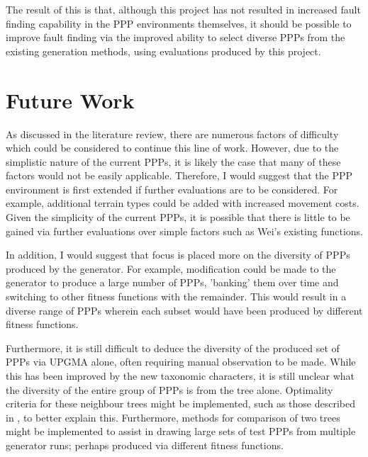 \documentclass[authoryearcitations]{UoYCSproject}
\begin{document}
The result of this is that, although this project has not resulted in increased fault finding capability in the PPP environments themselves, it should be possible to improve fault finding via the improved ability to select diverse PPPs from the existing generation methods, using evaluations produced by this project.

\chapter{Future Work}
\label{cha:futWork}
As discussed in the literature review, there are numerous factors of difficulty which could be considered to continue this line of work. However, due to the simplistic nature of the current PPPs, it is likely the case that many of these factors would not be easily applicable. Therefore, I would suggest that the PPP environment is first extended if further evaluations are to be considered. For example, additional terrain types could be added with increased movement costs. Given the simplicity of the current PPPs, it is possible that there is little to be gained via further evaluations over simple factors such as Wei's existing functions.

In addition, I would suggest that focus is placed more on the diversity of PPPs produced by the generator. For example, modification could be made to the generator to produce a large number of PPPs, 'banking' them over time and switching to other fitness functions with the remainder. This would result in a diverse range of PPPs wherein each subset would have been produced by different fitness functions.

Furthermore, it is still difficult to deduce the diversity of the produced set of PPPs via UPGMA alone, often requiring manual observation to be made. While this has been improved by the new taxonomic characters, it is still unclear what the diversity of the entire group of PPPs is from the tree alone. Optimality criteria for these neighbour trees might be implemented, such as those described in \cite[chapter 11, p.~426]{phylo}, to better explain this. Furthermore, methods for comparison of two trees \cite[chapter 11 p.~504]{phylo} might be implemented to assist in drawing large sets of test PPPs from multiple generator runs; perhaps produced via different fitness functions.
\end{document}
